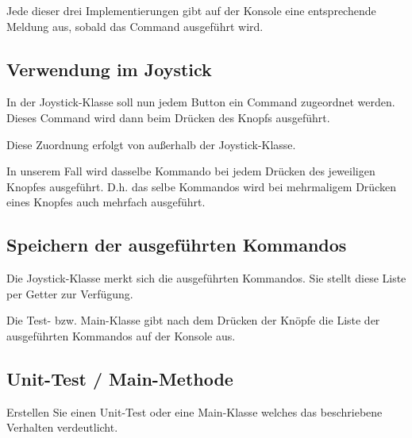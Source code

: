 \documentclass[oneside,a4paper]{scrartcl}
\begin{document}
Jede dieser drei Implementierungen gibt auf der Konsole eine entsprechende Meldung aus, sobald das
Command ausgeführt wird.


\subsection{Verwendung im Joystick}
In der Joystick-Klasse soll nun jedem Button ein Command zugeordnet werden.
Dieses Command wird dann beim Drücken des Knopfs ausgeführt.

Diese Zuordnung erfolgt von außerhalb der Joystick-Klasse.

In unserem Fall wird dasselbe Kommando bei jedem Drücken des jeweiligen Knopfes ausgeführt. D.h.
das selbe Kommandos wird bei mehrmaligem Drücken eines Knopfes auch mehrfach ausgeführt.

\subsection{Speichern der ausgeführten Kommandos}

Die Joystick-Klasse merkt sich die ausgeführten Kommandos. Sie stellt diese Liste per Getter zur Verfügung.

Die Test- bzw. Main-Klasse gibt nach dem Drücken der Knöpfe die Liste der ausgeführten Kommandos auf der Konsole
aus.


\subsection{Unit-Test / Main-Methode}
Erstellen Sie einen Unit-Test oder eine Main-Klasse welches das beschriebene Verhalten verdeutlicht.
\end{document}
